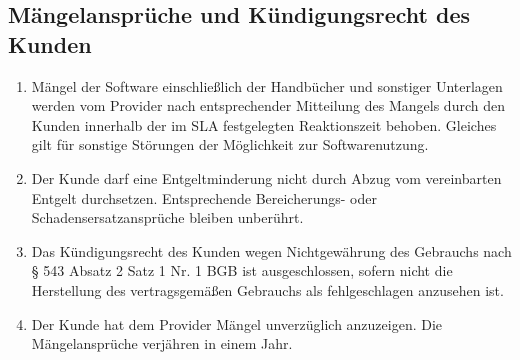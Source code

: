 \documentclass{terms}
\begin{document}
\subsection{Mängelansprüche und Kündigungsrecht des Kunden}
\begin{enumerate}
\item Mängel der Software einschließlich der Handbücher und sonstiger Unterlagen werden vom Provider nach entsprechender Mitteilung des Mangels durch den Kunden innerhalb der im SLA festgelegten Reaktionszeit behoben.
      Gleiches gilt für sonstige Störungen der Möglichkeit zur Softwarenutzung.
\item Der Kunde darf eine Entgeltminderung nicht durch Abzug vom vereinbarten Entgelt durchsetzen.
      Entsprechende Bereicherungs- oder Schadensersatzansprüche bleiben unberührt.
\item Das Kündigungsrecht des Kunden wegen Nichtgewährung des Gebrauchs nach § 543 Absatz 2 Satz 1 Nr. 1 BGB ist ausgeschlossen, sofern nicht die Herstellung des vertragsgemäßen Gebrauchs als fehlgeschlagen anzusehen ist.
\item Der Kunde hat dem Provider Mängel unverzüglich anzuzeigen.
      Die Mängelansprüche verjähren in einem Jahr.
\end{enumerate}
\end{document}
